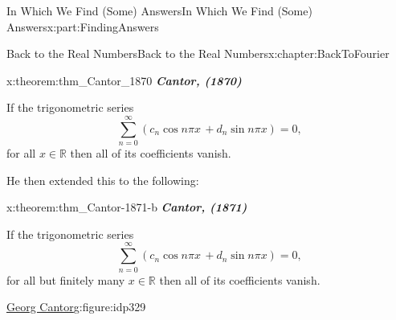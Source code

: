 \documentclass[oneside,10pt,]{book}
\newcommand{\alert}[1]{\textbf{\textit{#1}}}
\numberwithin{equation}{section}
\newcommand{\RR}{\mathbb {R}}
\begin{document}
\begin{partptx}{In Which We Find (Some) Answers}{}{In Which We Find (Some) Answers}{}{}{x:part:FindingAnswers}
\begin{chapterptx}{Back to the Real Numbers}{}{Back to the Real Numbers}{}{}{x:chapter:BackToFourier}
\begin{introduction}{}
\begin{theorem}{}{}{x:theorem:thm_Cantor_1870}
\alert{Cantor, (1870)}%
\par
{} If the trigonometric series%
\begin{equation*}
\sum_{n=0}^\infty\left(c_n\cos n\pi  x\,+d_n\sin n\pi x\right) = 0\text{,}
\end{equation*}
for all \(x\in\RR\) then all of its coefficients vanish.%
\end{theorem}
He then extended this to the following:%
\begin{theorem}{}{}{x:theorem:thm_Cantor-1871-b}%
\alert{Cantor, (1871)}%
\par
{} If the trigonometric series%
\begin{equation*}
\sum_{n=0}^\infty\left(c_n\cos n\pi  x\,+d_n\sin n\pi x\right) = 0\text{,}
\end{equation*}
for all but finitely many \(x\in\RR\) then all of its coefficients vanish.%
\end{theorem}
\begin{figureptx}{\href{https://mathshistory.st-andrews.ac.uk/Biographies/Cantor/}{Georg Cantor}\protect\footnotemark{}}{g:figure:idp329}{}%
%
\begin{image}{0.325}{0.35}{0.325}%

\end{image}
\end{figureptx}
\end{introduction}
\end{chapterptx}
\end{partptx}
\end{document}
